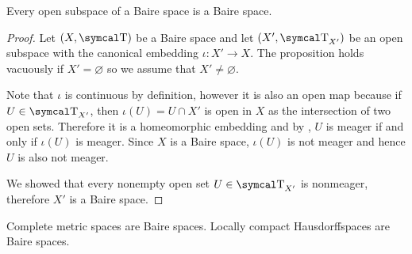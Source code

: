 \begin{proposition}\label{thm:open_subspace_of_baire_space_is_baire}
  Every open subspace of a Baire space is a Baire space.
\end{proposition}
\begin{proof}
  Let \( (X, \CT) \) be a Baire space and let \( (X', \CT_{X'}) \) be an open subspace with the canonical embedding \( \iota: X' \to X \). The proposition holds vacuously if \( X' = \varnothing \) so we assume that \( X' \neq \varnothing \).

  Note that \( \iota \) is continuous by definition, however it is also an open map because if \( U \in \CT_{X'} \), then \( \iota(U) = U \cap X' \) is open in \( X \) as the intersection of two open sets. Therefore it is a homeomorphic embedding and by , \( U \) is meager if and only if \( \iota(U) \) is meager. Since \( X \) is a Baire space, \( \iota(U) \) is not meager and hence \( U \) is also not meager.

  We showed that every nonempty open set \( U \in \CT_{X'} \) is nonmeager, therefore \( X' \) is a Baire space.
\end{proof}

\begin{theorem}\label{thm:baire_category_theorem}\cite{Rudin1991}
  \begin{thmenum}
     Complete metric spaces are Baire spaces.
     Locally compact Hausdorffspaces are Baire spaces.
  \end{thmenum}
\end{theorem}
